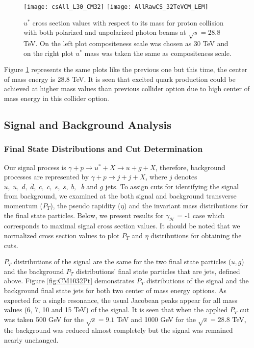 \documentclass{appolb}
\begin{document}
\begin{figure}[h!]
	\centering
	\texttt{[image: csAll\_L30\_CM32]}%
	\texttt{[image: AllRawCS\_32TeVCM\_LEM]}
	\caption{\label{fig:sc28800} $u^*$ cross section values  with respect to  its mass  for proton collision with both polarized and unpolarized photon beams at $\sqrt{s} = 28.8$ TeV.  On the left plot compositeness scale was chosen as 30 TeV and on the right plot $u^*$ mass was taken the same as compositeness scale.}
\end{figure}

Figure \ref{fig:sc28800} represents the same plots like the previous one but this time, the center of mass energy is 28.8 TeV. It is seen that excited quark production could be achieved at higher mass values than previous collider option due to high center of mass energy in this collider option. 

\subsection{\label{subsec:signal}Signal and Background Analysis} 
\subsubsection{\label{subsubsec:finalstate} Final State Distributions and Cut Determination}
Our signal process is  $\gamma + p \rightarrow u^* + X\rightarrow   u + g   +X$, therefore,  background processes are represented by  $\gamma + p \rightarrow  j + j + X$, where $j$ denotes   $u, \; \bar{u},\;d,\;\bar{d},\; c,\; \bar{c},\; s,\; \bar{s},\; b,$ $\;\bar{b}$ and $g$ jets. To assign cuts for identifying the signal from background, we examined at the both signal and background transverse momentum ($P_T$), the pseudo rapidity ($\eta$)  and the invariant mass distributions for the final state particles. Below, we present results for $\gamma_{\mathcal{H}}$ = -1 case which corresponds to maximal signal cross section values. It should be noted that we normalized cross section values to plot $P_T$ and $\eta$ distributions for obtaining the cuts. 

$P_T$ distributions of the signal are the same for the two final state particles ($u, g$) and the  background $P_T$ distributions’ final state particles that are jets, defined above. Figure \ref{fig:CM1032Pt} demonstrates  $P_T$ distributions of the signal  and the background  final state jets for both two center of mass energy options.  As expected for a single resonance, the usual  Jacobean peaks appear for all mass values (6, 7, 10 and 15 TeV) of the signal. It is seen that when the applied $P_T$ cut was taken 500 GeV for the $\sqrt{s} = 9.1$ TeV and 1000 GeV for the $\sqrt{s} = 28.8$ TeV, the background  was  reduced almost completely  but the signal was remained nearly unchanged. 
\end{document}
